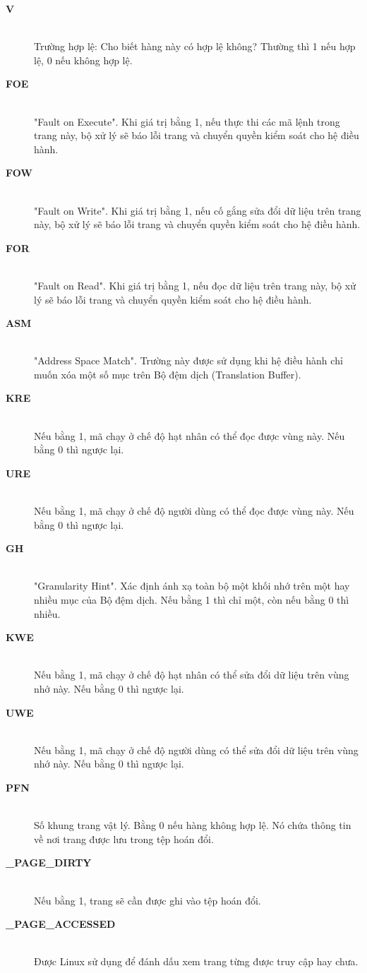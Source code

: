\documentclass{article}
\begin{document}
\begin{description}
  \item[\textbf{V}]\hfill \\ Trường hợp lệ: Cho biết hàng này có hợp lệ không? Thường thì 1 nếu hợp lệ, 0 nếu không hợp lệ.
  \item[\textbf{FOE}]\hfill \\ "Fault on Execute". Khi giá trị bằng 1, nếu thực thi các mã lệnh trong trang này, bộ xử lý sẽ báo lỗi trang và chuyển quyền kiểm soát cho hệ điều hành.
  \item[\textbf{FOW}]\hfill \\ "Fault on Write". Khi giá trị bằng 1, nếu cố gắng sửa đổi dữ liệu trên trang này, bộ xử lý sẽ báo lỗi trang và chuyển quyền kiểm soát cho hệ điều hành.
  \item[\textbf{FOR}]\hfill \\ "Fault on Read". Khi giá trị bằng 1, nếu đọc dữ liệu trên trang này, bộ xử lý sẽ báo lỗi trang và chuyển quyền kiểm soát cho hệ điều hành.
  \item[\textbf{ASM}]\hfill \\ "Address Space Match". Trường này được sử dụng khi hệ điều hành chỉ muốn xóa một số mục trên Bộ đệm dịch (Translation Buffer).
  \item[\textbf{KRE}]\hfill \\ Nếu bằng 1, mã chạy ở chế độ hạt nhân có thể đọc được vùng này. Nếu bằng 0 thì ngược lại.
  \item[\textbf{URE}]\hfill \\ Nếu bằng 1, mã chạy ở chế độ người dùng có thể đọc được vùng này. Nếu bằng 0 thì ngược lại.
  \item[\textbf{GH}]\hfill \\ "Granularity Hint". Xác định ánh xạ toàn bộ một khối nhớ trên một hay nhiều mục của Bộ đệm dịch. Nếu bằng 1 thì chỉ một, còn nếu bằng 0 thì nhiều.
  \item[\textbf{KWE}]\hfill \\ Nếu bằng 1, mã chạy ở chế độ hạt nhân có thể sửa đổi dữ liệu trên vùng nhớ này. Nếu bằng 0 thì ngược lại.
  \item[\textbf{UWE}]\hfill \\ Nếu bằng 1, mã chạy ở chế độ người dùng có thể sửa đổi dữ liệu trên vùng nhớ này. Nếu bằng 0 thì ngược lại.
  \item[\textbf{PFN}]\hfill \\ Số khung trang vật lý. Bằng 0 nếu hàng không hợp lệ. Nó chứa thông tin về nơi trang được lưu trong tệp hoán đổi.
  \item[\textbf{\_PAGE\_DIRTY}]\hfill \\ Nếu bằng 1, trang sẽ cần được ghi vào tệp hoán đổi.
  \item[\textbf{\_PAGE\_ACCESSED}]\hfill \\ Được Linux sử dụng để đánh dấu xem trang từng được truy cập hay chưa.
\end{description}
\end{document}
